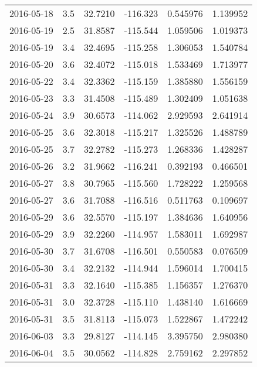 \begin{tabular}{lrrrrr}
2016-05-18 &       3.5 &  32.7210 &  -116.323 &         0.545976 &         1.139952 \\
2016-05-19 &       2.5 &  31.8587 &  -115.544 &         1.059506 &         1.019373 \\
2016-05-19 &       3.4 &  32.4695 &  -115.258 &         1.306053 &         1.540784 \\
2016-05-20 &       3.6 &  32.4072 &  -115.018 &         1.533469 &         1.713977 \\
2016-05-22 &       3.4 &  32.3362 &  -115.159 &         1.385880 &         1.556159 \\
2016-05-23 &       3.3 &  31.4508 &  -115.489 &         1.302409 &         1.051638 \\
2016-05-24 &       3.9 &  30.6573 &  -114.062 &         2.929593 &         2.641914 \\
2016-05-25 &       3.6 &  32.3018 &  -115.217 &         1.325526 &         1.488789 \\
2016-05-25 &       3.7 &  32.2782 &  -115.273 &         1.268336 &         1.428287 \\
2016-05-26 &       3.2 &  31.9662 &  -116.241 &         0.392193 &         0.466501 \\
2016-05-27 &       3.8 &  30.7965 &  -115.560 &         1.728222 &         1.259568 \\
2016-05-27 &       3.6 &  31.7088 &  -116.516 &         0.511763 &         0.109697 \\
2016-05-29 &       3.6 &  32.5570 &  -115.197 &         1.384636 &         1.640956 \\
2016-05-29 &       3.9 &  32.2260 &  -114.957 &         1.583011 &         1.692987 \\
2016-05-30 &       3.7 &  31.6708 &  -116.501 &         0.550583 &         0.076509 \\
2016-05-30 &       3.4 &  32.2132 &  -114.944 &         1.596014 &         1.700415 \\
2016-05-31 &       3.3 &  32.1640 &  -115.385 &         1.156357 &         1.276370 \\
2016-05-31 &       3.0 &  32.3728 &  -115.110 &         1.438140 &         1.616669 \\
2016-05-31 &       3.5 &  31.8113 &  -115.073 &         1.522867 &         1.472242 \\
2016-06-03 &       3.3 &  29.8127 &  -114.145 &         3.395750 &         2.980380 \\
2016-06-04 &       3.5 &  30.0562 &  -114.828 &         2.759162 &         2.297852 \\

\end{tabular}
